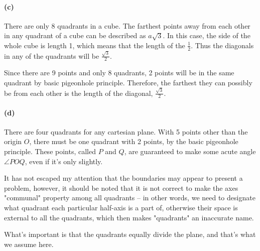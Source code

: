 \documentclass[a4paper]{article}
\begin{document}
\paragraph{(c)} There are only 8 quadrants in a cube. The farthest points away from each other in any quadrant of a cube can be described as $a \sqrt{3}$. In this case, the side of the whole cube is length 1, which means that the length of the $\frac{1}{2}$. Thus the diagonals in any of the quadrants will be $\frac{\sqrt{3}}{2}$.

Since there are 9 points and only 8 quadrants, 2 points will be in the same quadrant by basic pigeonhole principle. Therefore, the farthest they can possibly be from each other is the length of the diagonal, $\frac{\sqrt{3}}{2}$.

\paragraph{(d)} There are four quadrants for any cartesian plane. With 5 points other than the origin $O$, there must be one quadrant with 2 points, by the basic pigeonhole principle. These points, called $P$ and $Q$, are guaranteed to make some acute angle $\angle POQ$, even if it's only slightly.

It has not escaped my attention that the boundaries may appear to present a problem, however, it should be noted that it is not correct to make the axes "communal" property among all quadrants -- in other words, we need to designate what quadrant each particular half-axis is a part of, otherwise their space is external to all the quadrants, which then makes "quadrants" an inaccurate name.

What's important is that the quadrants equally divide the plane, and that's what we assume here.
\end{document}
